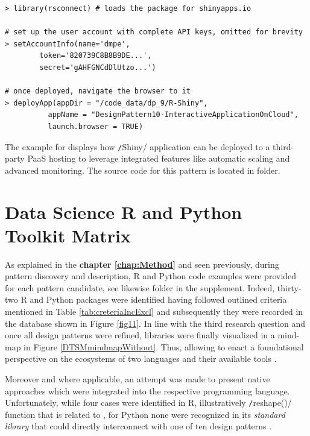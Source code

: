 \begin{listing}[H]
  \begin{verbatim}
> library(rsconnect) # loads the package for shinyapps.io

# set up the user account with complete API keys, omitted for brevity
> setAccountInfo(name='dmpe',
        token='820739C8B8B9DE...',
        secret='gAHFGNCdDlUtzo...') 

# once deployed, navigate the browser to it
> deployApp(appDir = "/code_data/dp_9/R-Shiny", 
          appName = "DesignPattern10-InteractiveApplicationOnCloud", 
          launch.browser = TRUE)
  \end{verbatim}
\caption[Example for Cloud Design Pattern.]{The example for  displays how \texttt/Shiny/ application can be deployed to a third-party PaaS hosting to leverage integrated features like automatic scaling and advanced monitoring.
The source code for this pattern is located in  folder.}
\label{lst:code_pattern11}
\end{listing}

\section{Data Science R and Python Toolkit Matrix}
As explained in the \textbf{chapter \ref{chap:Method}} and seen previously, during pattern discovery and description, R and Python code examples were provided for each pattern candidate, see likewise  folder in the supplement.  
Indeed, thirty-two R and Python packages were identified having followed outlined criteria mentioned in Table \ref{tab:creteriaIncExcl} and subsequently they were recorded in the database shown in Figure \ref{fig11}. 
In line with the third research question and once all design patterns were refined, libraries were finally visualized in a mind-map in Figure \ref{DTSMmindmapWithout}.
Thus, allowing to enact a foundational perspective on the ecosystems of two languages and their available tools \parencite{SuriHarsh11}.

Moreover and where applicable, an attempt was made to present native approaches which were integrated into the respective programming language. 
Unfortunately, while four cases were identified in R, illustratively \texttt/reshape()/ function that is related to , for Python none were recognized in its \emph{standard library} that could directly interconnect with one of ten design patterns \parencite{PythonCoreStandartLib}.   

